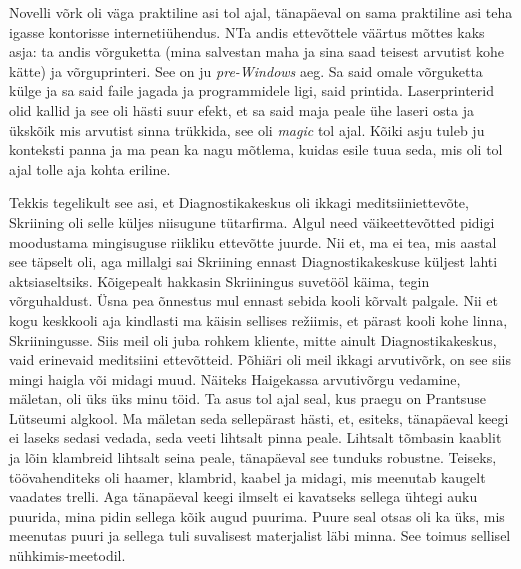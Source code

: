 
Novelli võrk oli väga praktiline asi tol ajal, tänapäeval on sama praktiline asi teha igasse kontorisse internetiühendus. NTa andis ettevõttele väärtus mõttes kaks asja: ta andis võrguketta (mina salvestan maha ja sina saad teisest arvutist kohe kätte) ja võrguprinteri. See on ju \emph{pre-Windows} aeg. Sa said omale võrguketta külge ja sa said faile jagada ja  programmidele ligi, said printida. Laserprinterid olid kallid ja see oli hästi suur efekt, et sa said maja peale ühe laseri osta ja ükskõik mis arvutist sinna trükkida, see oli \emph{magic} tol ajal. Kõiki asju tuleb ju konteksti panna ja ma pean ka nagu mõtlema, kuidas esile tuua seda, mis oli tol ajal tolle aja kohta eriline. 


Tekkis tegelikult see asi, et Diagnostikakeskus oli ikkagi meditsiiniettevõte, Skriining oli selle küljes niisugune tütarfirma. Algul need väikeettevõtted pidigi moodustama mingisuguse riikliku ettevõtte juurde. Nii et, ma ei tea, mis aastal see täpselt oli, aga millalgi sai Skriining ennast Diagnostikakeskuse küljest lahti aktsiaseltsiks. Kõigepealt hakkasin  Skriiningus suvetööl käima, tegin  võrguhaldust. Üsna pea õnnestus mul ennast sebida  kooli kõrvalt palgale. Nii et kogu keskkooli aja kindlasti ma käisin sellises režiimis, et  pärast kooli kohe linna, Skriiningusse. Siis meil oli juba rohkem kliente, mitte ainult Diagnostikakeskus, vaid erinevaid meditsiini ettevõtteid. Põhiäri oli meil ikkagi arvutivõrk, on see siis mingi haigla või midagi muud. Näiteks Haigekassa arvutivõrgu vedamine, mäletan, oli üks üks minu töid. Ta asus tol ajal seal, kus praegu on Prantsuse Lütseumi algkool. Ma mäletan seda sellepärast hästi, et, esiteks, tänapäeval keegi ei laseks sedasi vedada, seda veeti lihtsalt pinna peale. Lihtsalt tõmbasin kaablit ja lõin klambreid lihtsalt seina peale, tänapäeval see tunduks robustne. Teiseks, töövahenditeks oli haamer, klambrid, kaabel ja midagi, mis meenutab kaugelt vaadates trelli. Aga tänapäeval keegi ilmselt ei kavatseks sellega ühtegi auku puurida, mina pidin sellega kõik augud puurima. Puure seal otsas oli ka üks, mis meenutas puuri ja sellega tuli suvalisest materjalist läbi minna. See toimus sellisel nühkimis-meetodil. 

